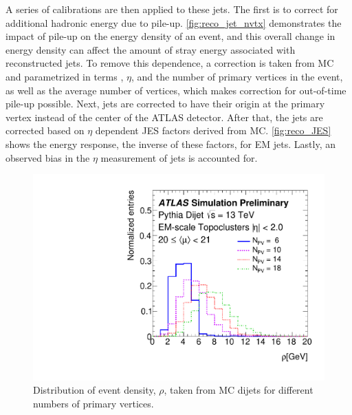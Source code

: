 A series of calibrations are then applied to these jets. The first is to correct for additional hadronic energy due to pile-up. \autoref{fig:reco_jet_nvtx} demonstrates the impact of pile-up on the energy density of an event, and this overall change in energy density can affect the amount of stray energy associated with reconstructed jets. To remove this dependence, a correction is taken from \ac{MC} and parametrized in terms \pt, $\eta$, and the number of primary vertices in the event, as well as the average number of vertices, which makes correction for out-of-time pile-up possible. Next, jets are corrected to have their origin at the primary vertex instead of the center of the \ac{ATLAS} detector. After that, the jets are corrected based on $\eta$ dependent \acf{JES} factors derived from \ac{MC}. \autoref{fig:reco_JES} shows the energy response, the inverse of these factors, for \ac{EM} jets. Lastly, an observed bias in the $\eta$ measurement of jets is accounted for. 

\begin{centering}
\begin{figure}[!hbt]
\myfloatalign
\includegraphics[width=.9\linewidth]{figures/reco/fig_02.pdf}
\caption{ Distribution of event \pt density, $\rho$, taken from \ac{MC} dijets for different numbers of primary vertices. \cite{ATL-PHYS-PUB-2015-015} }
\label{fig:reco_jet_nvtx}
\end{figure}
\end{centering}

